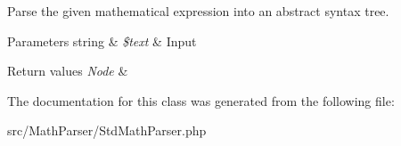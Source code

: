 Parse the given mathematical expression into an abstract syntax tree. 


\begin{DoxyParams}[1]{Parameters}
string & {\em \$text} & Input \\
\hline
\end{DoxyParams}

\begin{DoxyRetVals}{Return values}
{\em Node} & \\
\hline
\end{DoxyRetVals}


The documentation for this class was generated from the following file\-:\begin{DoxyCompactItemize}
\item 
src/\-Math\-Parser/Std\-Math\-Parser.\-php\end{DoxyCompactItemize}
